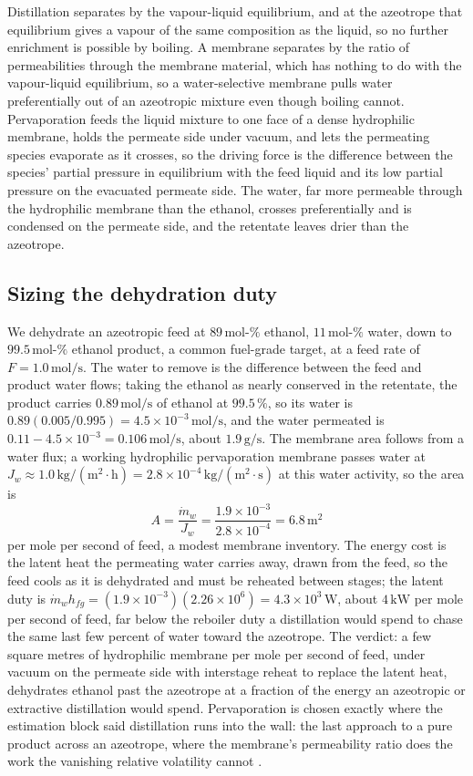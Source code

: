Distillation separates by the vapour-liquid equilibrium, and at the azeotrope
that equilibrium gives a vapour of the same composition as the liquid, so no
further enrichment is possible by boiling. A membrane separates by the ratio of
permeabilities through the membrane material, which has nothing to do with the
vapour-liquid equilibrium, so a water-selective membrane pulls water
preferentially out of an azeotropic mixture even though boiling cannot.
Pervaporation feeds the liquid mixture to one face of a dense hydrophilic
membrane, holds the permeate side under vacuum, and lets the permeating species
evaporate as it crosses, so the driving force is the difference between the
species' partial pressure in equilibrium with the feed liquid and its low
partial pressure on the evacuated permeate side. The water, far more permeable
through the hydrophilic membrane than the ethanol, crosses preferentially and
is condensed on the permeate side, and the retentate leaves drier than the
azeotrope.

\subsection*{Sizing the dehydration duty}

We dehydrate an azeotropic feed at $89\,\text{mol-}\%$ ethanol, $11\,\text{mol-
}\%$ water, down to $99.5\,\text{mol-}\%$ ethanol product, a common fuel-grade
target, at a feed rate of $F = 1.0\,\text{mol/s}$. The water to remove is the
difference between the feed and product water flows; taking the ethanol as
nearly conserved in the retentate, the product carries $0.89\,\text{mol/s}$ of
ethanol at $99.5\,\%$, so its water is $0.89(0.005/0.995) = 4.5\times 10^{-3}\,
\text{mol/s}$, and the water permeated is $0.11 - 4.5\times 10^{-3} =
0.106\,\text{mol/s}$, about $1.9\,\text{g/s}$. The membrane area follows from a
water flux; a working hydrophilic pervaporation membrane passes water at
$J_w \approx 1.0\,\text{kg}/(\text{m}^2\cdot\text{h}) = 2.8\times 10^{-4}\,
\text{kg}/(\text{m}^2\cdot\text{s})$ at this water activity, so the area is
\[
A = \frac{\dot m_w}{J_w} = \frac{1.9\times 10^{-3}}{2.8\times 10^{-4}} =
6.8\,\text{m}^2
\]
per mole per second of feed, a modest membrane inventory. The energy cost is
the latent heat the permeating water carries away, drawn from the feed, so the
feed cools as it is dehydrated and must be reheated between stages; the latent
duty is $\dot m_w h_{fg} = (1.9\times 10^{-3})(2.26\times 10^{6}) =
4.3\times 10^{3}\,\text{W}$, about $4\,\text{kW}$ per mole per second of feed,
far below the reboiler duty a distillation would spend to chase the same last
few percent of water toward the azeotrope. The verdict: a few square metres of
hydrophilic membrane per mole per second of feed, under vacuum on the permeate
side with interstage reheat to replace the latent heat, dehydrates ethanol
past the azeotrope at a fraction of the energy an azeotropic or extractive
distillation would spend. Pervaporation is chosen exactly where the estimation
block said distillation runs into the wall: the last approach to a pure product
across an azeotrope, where the membrane's permeability ratio does the work the
vanishing relative volatility cannot \cite{text:perry-chemical-engineers}.

